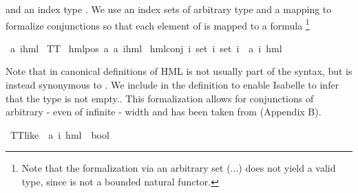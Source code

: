 \begin{isabellebody}
\begin{isamarkuptext}
and an index type . We use an index sets of arbitrary type  and a mapping  to formalize
conjunctions so that each element of  is mapped to a formula%
\footnote{Note that the formalization via an arbitrary set (...) does not yield a valid type, since  is not a bounded natural functor.}%
\end{isamarkuptext}\isamarkuptrue%
\isamarkupfalse%
\ {\isacharparenleft}{\kern0pt}{\isacharprime}{\kern0pt}a{\isacharcomma}{\kern0pt}\ {\isacharprime}{\kern0pt}i{\isacharparenright}{\kern0pt}hml\ {\isacharequal}{\kern0pt}\isanewline
TT\ {\isacharbar}{\kern0pt}\isanewline
hml{\isacharunderscore}{\kern0pt}pos\ {\isacartoucheopen}{\isacharprime}{\kern0pt}a{\isacartoucheclose}\ {\isacartoucheopen}{\isacharparenleft}{\kern0pt}{\isacharprime}{\kern0pt}a{\isacharcomma}{\kern0pt}\ {\isacharprime}{\kern0pt}i{\isacharparenright}{\kern0pt}hml{\isacartoucheclose}\ {\isacharbar}{\kern0pt}\isanewline
hml{\isacharunderscore}{\kern0pt}conj\ {\isachardoublequoteopen}{\isacharprime}{\kern0pt}i\ set{\isachardoublequoteclose}\ {\isachardoublequoteopen}{\isacharprime}{\kern0pt}i\ set{\isachardoublequoteclose}\ {\isachardoublequoteopen}{\isacharprime}{\kern0pt}i\ {\isasymRightarrow}\ {\isacharparenleft}{\kern0pt}{\isacharprime}{\kern0pt}a{\isacharcomma}{\kern0pt}\ {\isacharprime}{\kern0pt}i{\isacharparenright}{\kern0pt}\ hml{\isachardoublequoteclose}%
\begin{isamarkuptext}%
Note that in canonical definitions of HML  is not usually part of the syntax,
but is instead synonymous to \isa{{\isasymAnd}{\isacharbraceleft}{\kern0pt}{\isacharbraceright}{\kern0pt}}.
We include  in the definition to enable Isabelle to infer that the type  is not empty..
This formalization allows for conjunctions of arbitrary - even of infinite - width and has been
taken from \cite{Pohlmann2021ReducingReactive} (Appendix B).%
\end{isamarkuptext}\isamarkuptrue%
\isamarkupfalse%
\ TT{\isacharunderscore}{\kern0pt}like\ {\isacharcolon}{\kern0pt}{\isacharcolon}{\kern0pt}\ {\isachardoublequoteopen}{\isacharparenleft}{\kern0pt}{\isacharprime}{\kern0pt}a{\isacharcomma}{\kern0pt}\ {\isacharprime}{\kern0pt}i{\isacharparenright}{\kern0pt}\ hml\ {\isasymRightarrow}\ bool{\isachardoublequoteclose}\isanewline

\end{isabellebody}
